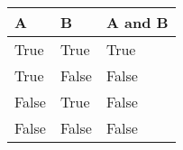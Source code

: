 \documentclass{article}
\begin{document}
\begin{tabular}{l|l|l}
A & B & A and B \\ \hline
True & True & True \\
True & False & False \\
False & True & False \\
False & False & False
\end{tabular} 
\end{document}
